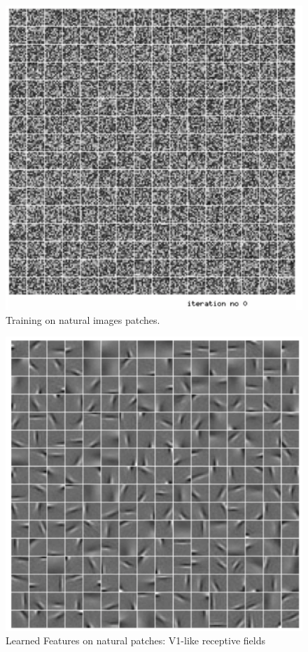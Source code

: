 \documentclass[12pt,letterpaper]{article}
\begin{document}
\begin{figure}[H]
\centering
\includegraphics[width=1.0\linewidth]{natural_0.png}
\caption{Training on natural images patches.}
\label{natural_0}
\end{figure}

\begin{figure}[H]
\centering
\includegraphics[width=1.0\linewidth]{natural.png}
\caption{Learned Features on natural patches:
V1-like receptive fields}
\label{natural}
\end{figure}
\end{document}
